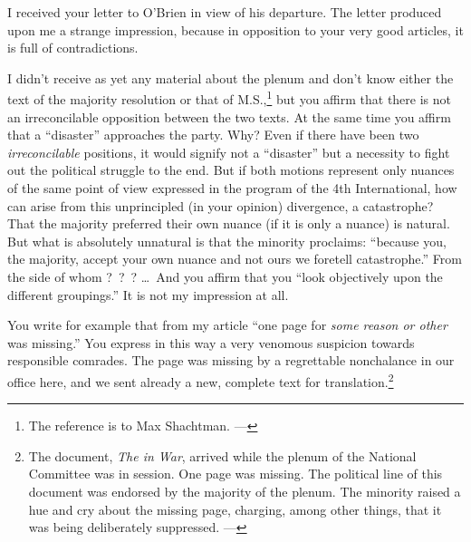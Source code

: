 

\noindent
I received your letter to O’Brien in view of his departure. The letter produced upon me a strange impression, because in opposition to your very good articles, it is full of contradictions.

I didn’t receive as yet any material about the plenum and don’t know either the text of the majority resolution or that of M.S.,\footnote{The reference is to Max Shachtman. ---\ed} but you affirm that there is not an irreconcilable opposition between the two texts. At the same time you affirm that a “disaster” approaches the party. Why? Even if there have been two \emph{irreconcilable} positions, it would signify not a “disaster” but a necessity to fight out the political struggle to the end. But if both motions represent only nuances of the same point of view expressed in the program of the 4th International, how can arise from this unprincipled (in your opinion) divergence, a catastrophe? That the majority preferred their own nuance (if it is only a nuance) is natural. But what is absolutely unnatural is that the minority proclaims: “because you, the majority, accept your own nuance and not ours we foretell catastrophe.” From the side of whom ?~?~? \dots\ And you affirm that you “look objectively upon the different groupings.” It is not my impression at all.

You write for example that from my article “one page for \emph{some reason or other} was missing.” You express in this way a very venomous suspicion towards responsible comrades. The page was missing by a regrettable nonchalance in our office here, and we sent already a new, complete text for translation.\footnote{The document, \emph{The  in War}, arrived while the plenum of the National Committee was in session. One page was missing. The political line of this document was endorsed by the majority of the plenum. The minority raised a hue and cry about the missing page, charging, among other things, that it was being deliberately suppressed. ---\ed}

